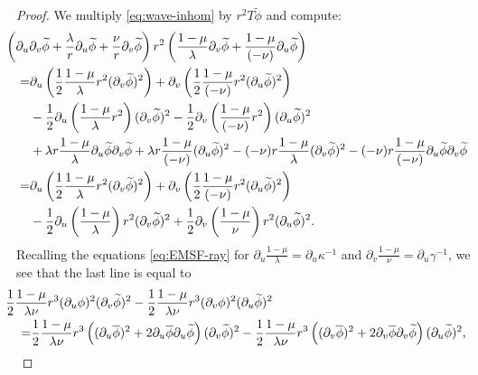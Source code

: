 \documentclass[10pt, reqno]{amsart}
\theoremstyle{definition}
\theoremstyle{remark}
\theoremstyle{conjecture}
\numberwithin{equation}{section}
\newcommand{\rd}{\partial}
\newcommand{\0}{\emptyset}
\newcommand{\gmm}{\gamma}
\newcommand{\kpp}{\kappa}
\newcommand{\lmb}{\lambda}
\newcommand{\dur}{\nu}
\newcommand{\dvr}{\lmb}
\newcommand{\phibg}{\overline{\phi}}				%
\newcommand{\phidf}{\widetilde{\phi}}				%
\begin{document}
\begin{proof}
We multiply \eqref{eq:wave-inhom} by $r^{2} T \phidf$ and compute:
\begin{align*}
& \hskip-2em 
	\left(\rd_{u} \rd_{v} \phidf + \frac{\dvr}{r} \rd_{u} \phidf + \frac{\dur}{r} \rd_{v} \phidf \right) r^{2} \left( \frac{1-\mu}{\dvr} \rd_{v} \phidf + \frac{1-\mu}{(-\dur)} \rd_{u} \phidf \right) \\
	= & \rd_{u} \left( \frac{1}{2} \frac{1-\mu}{\dvr} r^{2} (\rd_{v} \phidf)^{2}\right) 
	+ \rd_{v} \left( \frac{1}{2} \frac{1-\mu}{(-\dur)} r^{2} (\rd_{u} \phidf)^{2} \right) \\
	& - \frac{1}{2} \rd_{u}\left( \frac{1-\mu}{\dvr} r^{2} \right) (\rd_{v} \phidf)^{2} 
	- \frac{1}{2} \rd_{v} \left( \frac{1-\mu}{(-\dur)} r^{2} \right) (\rd_{u} \phidf)^{2} \\
	& + \dvr r \frac{1-\mu}{\dvr} \rd_{u} \phidf \rd_{v} \phidf + \dvr r \frac{1-\mu}{(-\dur)} (\rd_{u} \phidf)^{2} 
	 - (-\dur) r \frac{1-\mu}{\dvr} (\rd_{v} \phidf)^{2} - (-\dur) r \frac{1-\mu}{(-\dur)} \rd_{u} \phidf \rd_{v} \phidf \\
	= & \rd_{u} \left( \frac{1}{2} \frac{1-\mu}{\dvr} r^{2} (\rd_{v} \phidf)^{2}\right) 
	+ \rd_{v} \left( \frac{1}{2} \frac{1-\mu}{(-\dur)} r^{2} (\rd_{u} \phidf)^{2} \right) \\
	& - \frac{1}{2} \rd_{u}\left( \frac{1-\mu}{\dvr} \right) r^{2} (\rd_{v} \phidf)^{2} 
	+ \frac{1}{2} \rd_{v} \left( \frac{1-\mu}{\dur}\right) r^{2}  (\rd_{u} \phidf)^{2}.
\end{align*}
Recalling the equations \eqref{eq:EMSF-ray} for $\rd_{u} \frac{1-\mu}{\dvr} = \rd_{u} \kpp^{-1}$ and $\rd_{v} \frac{1-\mu}{\dur} = \rd_{u} \gmm^{-1}$, we see that the last line is equal to
\begin{align*}
& \hskip-2em
	\frac{1}{2}  \frac{1-\mu}{\dvr \dur}  r^{3} (\rd_{u} \phi)^{2} (\rd_{v} \phidf)^{2} 
	- \frac{1}{2} \frac{1-\mu}{\dvr \dur}  r^{3} (\rd_{v} \phi)^{2}  (\rd_{u} \phidf)^{2} \\
	= & \frac{1}{2}  \frac{1-\mu}{\dvr \dur}  r^{3} \left( (\rd_{u} \phibg)^{2} + 2 \rd_{u} \phibg \rd_{u} \phidf \right) (\rd_{v} \phidf)^{2} 
	- \frac{1}{2} \frac{1-\mu}{\dvr \dur}  r^{3} \left( (\rd_{v} \phibg)^{2} + 2 \rd_{v} \phibg \rd_{v} \phidf \right)  (\rd_{u} \phidf)^{2} ,
\end{align*}

\end{proof}
\end{document}
